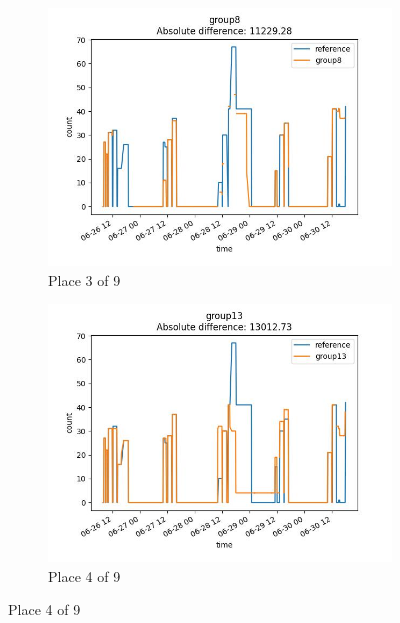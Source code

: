 \begin{figure}
    \begin{subfigure}[b]{0.45\textwidth}
        \includegraphics[width=\linewidth]{figures/ref-group8.jpeg}
        \caption{Place 3 of 9}
    \end{subfigure}
    \begin{subfigure}[b]{0.45\textwidth}
        \includegraphics[width=\linewidth]{figures/ref-group13.jpeg}
        \caption{Place 4 of 9}
    \end{subfigure}


\end{figure}
